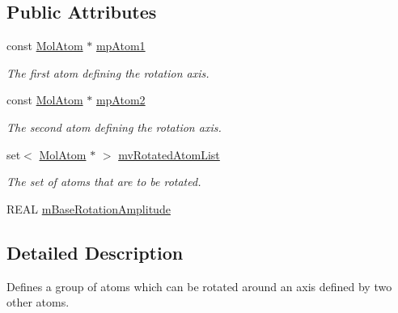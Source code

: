 \subsection*{Public Attributes}
\begin{DoxyCompactItemize}
\item 
\mbox{\label{struct_obj_cryst_1_1_molecule_1_1_rotor_group_a58f9b6ed1fc288d547a1617b17e75316}} 
const \mbox{\hyperlink{class_obj_cryst_1_1_mol_atom}{Mol\+Atom}} $\ast$ \mbox{\hyperlink{struct_obj_cryst_1_1_molecule_1_1_rotor_group_a58f9b6ed1fc288d547a1617b17e75316}{mp\+Atom1}}
\begin{DoxyCompactList}\small\item\em The first atom defining the rotation axis. \end{DoxyCompactList}\item 
\mbox{\label{struct_obj_cryst_1_1_molecule_1_1_rotor_group_ae6829772d661cbdef458f20a6d2d83a6}} 
const \mbox{\hyperlink{class_obj_cryst_1_1_mol_atom}{Mol\+Atom}} $\ast$ \mbox{\hyperlink{struct_obj_cryst_1_1_molecule_1_1_rotor_group_ae6829772d661cbdef458f20a6d2d83a6}{mp\+Atom2}}
\begin{DoxyCompactList}\small\item\em The second atom defining the rotation axis. \end{DoxyCompactList}\item 
\mbox{\label{struct_obj_cryst_1_1_molecule_1_1_rotor_group_a2ff8b0fdb5c57289ffbc53f301331caa}} 
set$<$ \mbox{\hyperlink{class_obj_cryst_1_1_mol_atom}{Mol\+Atom}} $\ast$ $>$ \mbox{\hyperlink{struct_obj_cryst_1_1_molecule_1_1_rotor_group_a2ff8b0fdb5c57289ffbc53f301331caa}{mv\+Rotated\+Atom\+List}}
\begin{DoxyCompactList}\small\item\em The set of atoms that are to be rotated. \end{DoxyCompactList}\item 
R\+E\+AL \mbox{\hyperlink{struct_obj_cryst_1_1_molecule_1_1_rotor_group_ab98013a7f74a26ebe8d04c066f9ea49d}{m\+Base\+Rotation\+Amplitude}}
\end{DoxyCompactItemize}


\subsection{Detailed Description}
Defines a group of atoms which can be rotated around an axis defined by two other atoms. 

